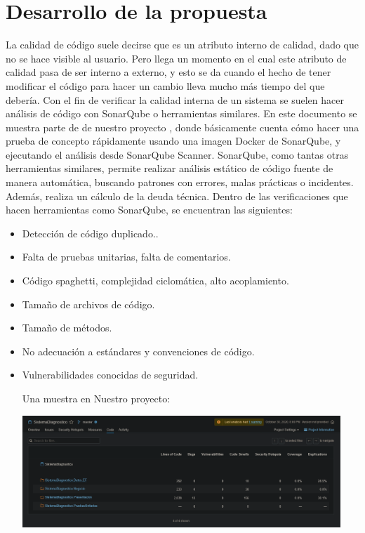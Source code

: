 \documentclass[preprint,12pt,notitlepage]{elsarticle}
\begin{document}
\section{Desarrollo de la propuesta}
La calidad de código suele decirse que es un atributo interno de calidad, dado que no se hace visible al usuario. Pero llega un momento en el cual este atributo de calidad pasa de ser interno a externo, y esto se da cuando el hecho de tener modificar el código para hacer un cambio lleva mucho más tiempo del que debería. Con el fin de verificar la calidad interna de un sistema se suelen hacer análisis de código con SonarQube o herramientas similares. En este documento se muestra parte de de nuestro proyecto , donde básicamente cuenta cómo hacer una prueba de concepto rápidamente usando una imagen Docker de SonarQube, y ejecutando el análisis desde SonarQube Scanner.
SonarQube, como tantas otras herramientas similares, permite realizar análisis estático de código fuente de manera automática, buscando patrones con errores, malas prácticas o incidentes. Además, realiza un cálculo de la deuda técnica. Dentro de las verificaciones que hacen herramientas como SonarQube, se encuentran las siguientes:
\begin{itemize}
	\item Detección de código duplicado..
	\item Falta de pruebas unitarias, falta de comentarios. 
	\item Código spaghetti, complejidad ciclomática, alto acoplamiento.
	\item Tamaño de archivos de código.
	\item Tamaño de métodos.
	\item No adecuación a estándares y convenciones de código.
	\item Vulnerabilidades conocidas de seguridad.
	
	Una muestra en Nuestro proyecto:
		
\begin{center}
	\includegraphics[width=12cm]{./imagen/Screenshot_2020-10-30 Code.png} 
	\end{center}
\end{itemize}
\end{document}
